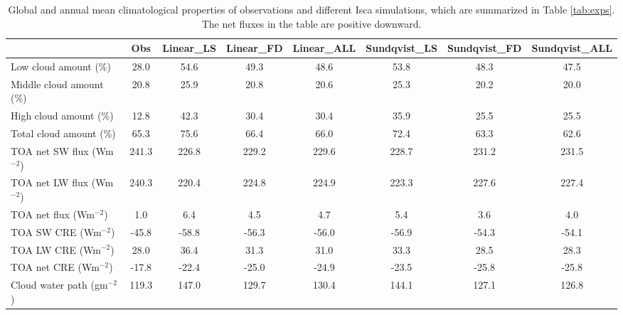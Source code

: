 \begin{sidewaystable}
	\caption{Global and annual mean climatological properties of observations and different Isca simulations, which are summarized in Table \ref{tab:exps}. The net fluxes in the table are positive downward. }
	\vspace{0.5em}
	\centering
	\renewcommand{\arraystretch}{1.5}
	\begin{threeparttable}
	\begin{tabular}{lccccccc}
    	\hline
    	{} &   Obs &  Linear\_LS &  Linear\_FD &  Linear\_ALL &  Sundqvist\_LS &  Sundqvist\_FD &  Sundqvist\_ALL \\
    	\hline
    	Low cloud amount (\%)      &  28.0\tnote{a} &       54.6 &       49.3 &        48.6 &          53.8 &          48.3 &           47.5 \\
    	Middle cloud amount (\%)   &  20.8\tnote{a} &       25.9 &       20.8 &        20.6 &          25.3 &          20.2 &           20.0 \\
    	High cloud amount (\%)     &  12.8\tnote{a} &       42.3 &       30.4 &        30.4 &          35.9 &          25.5 &           25.5 \\
    	Total cloud amount (\%)    &  65.3\tnote{a} &       75.6 &       66.4 &        66.0 &          72.4 &          63.3 &           62.6 \\
    	TOA net SW flux (Wm$^{-2}$)  & 241.3\tnote{b} &      226.8 &      229.2 &       229.6 &         228.7 &         231.2 &          231.5 \\
    	TOA net LW flux (Wm$^{-2}$)  & 240.3\tnote{b} &      220.4 &      224.8 &       224.9 &         223.3 &         227.6 &          227.4 \\
    	TOA net flux (Wm$^{-2}$)     &   1.0\tnote{b} &        6.4 &        4.5 &         4.7 &           5.4 &           3.6 &            4.0 \\
    	TOA SW CRE (Wm$^{-2}$)       & -45.8\tnote{b} &      -58.8 &      -56.3 &       -56.0 &         -56.9 &         -54.3 &          -54.1 \\
    	TOA LW CRE (Wm$^{-2}$)       &  28.0\tnote{b} &       36.4 &       31.3 &        31.0 &          33.3 &          28.5 &           28.3 \\
    	TOA net CRE (Wm$^{-2}$)      & -17.8\tnote{b} &      -22.4 &      -25.0 &       -24.9 &         -23.5 &         -25.8 &          -25.8 \\
    	Cloud water path (gm$^{-2}$) & 119.3\tnote{c} &      147.0 &      129.7 &       130.4 &         144.1 &         127.1 &          126.8 \\
    	\hline
    \end{tabular}
    

\end{threeparttable}
\end{sidewaystable}
